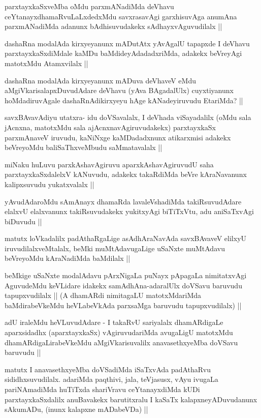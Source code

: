 \begin{artha}
parxtayxkaSxveMba oMdu parxmANadiMda deVhavu ceYtanayxdhamaRvuLaLxdedxMdu savxrasavAgi garxhisuvAga anumAna parxmANadiMda adanunx bAdhisuvudakekx sAdhayxvAguvudilalx ||
\end{artha}

\begin{artha}
dashaRna modalAda kirxyeyanunx mADutAtx yAvAgalU tapapxde I deVhavu parxtayxkaSxdiMdale kaMDu baMdideyAdadadxriMda, adakekx beVreyAgi matotxMdu Atamxvilalx ||
\end{artha}

\begin{artha}
dashaRna modalAda kirxyeyanunx mADuva deVhaveV eMdu aMgiVkarisalapxDuvudAdare deVhavu (yAva BAgadalUlx) cuyxtiyanunx hoMdadiruvAgale dashaRnAdikirxyeyu hAge kANadeyiruvudu EtariMda? ||
\end{artha}

\begin{artha}
savxBAvavAdiyu utatxra- idu doVSavalalx, I deVhada viSayadalilx (oMdu sala jAcnxna, matotxMdu sala ajAcnxnavAgiruvudakekx) parxtayxkaSx parxmAnaveV iruvudu, kaNiNxge kaMDadadxnunx atikarxmisi adakekx beVreyoMdu baliSaThxveMbudu saMmatavalalx ||
\end{artha}

\begin{artha}
miNaku huLuvu parxkAshavAgiruvu aparxkAshavAgiruvudU saha parxtayxkaSxdalelxV kANuvudu, adakekx takaRdiMda beVre kAraNavanunx kalipxsuvudu yukatxvalalx ||
\end{artha}

\begin{artha}
yAvudAdaroMdu sAmAnayx dhamaRda lavaleVshadiMda takiRsuvudAdare elalxvU elalxvanunx takiRsuvudakekx yukitxyAgi biTiTxVtu, adu aniSaTxvAgi biDuvudu ||

matutx loVkadalilx padAthaRgaLige asAdhAraNavAda savxBAvaveV elilxyU iruvudilalxveMtalalx, beMki muMtAdavugaLige uSaNxte muMtAdavu beVreyoMdu kAraNadiMda baMdilalx ||

beMkige uSaNxte modalAdavu pArxNigaLa puNayx pApagaLa nimitatxvAgi AguvudeMdu keVLidare idakekx samAdhAna-adaralUlx doVSavu baruvudu tapupxvudilalx || (A dhamARdi nimitagaLU matotxMdariMda baMdirabeVkeMdu heVLabeVkAda parxsaMga baruvudu tapupxvudilalx) ||

adU iraleMdu heVLuvudAdare - I takaRvU sariyalalx dhamARdigaLe aparxsidadhx (aparxtayxkaSx) vAgiruvudariMda avugaLigU matotxMdu dhamARdigaLirabeVkeMdu aMgiVkarisuvalilx anavasethxyeMba doVSavu baruvudu ||

matutx I anavasethxyeMba doVSadiMda iSaTxvAda padAthaRvu sididhxsuvudilalx. adariMda paqthivi, jala, teVjasusx, vAyu ivugaLa pariNAmadiMda huTiTxda shariVravu ceYtanayxdiMda kUDi parxtayxkaSxdalilx anuBavakekx barutitxralu I kaSaTx kalapxneyADuvudanunx sAkumADu, (inunx kalapxne mADabeVDa) ||
\end{artha}

